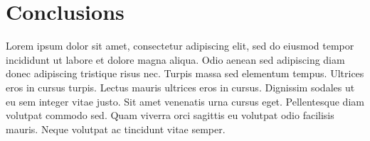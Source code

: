 \chapter{Conclusions}
\label{chapter:conclusions}

Lorem ipsum dolor sit amet, consectetur adipiscing elit, sed do eiusmod tempor incididunt ut labore et dolore magna aliqua. Odio aenean sed adipiscing diam donec adipiscing tristique risus nec. Turpis massa sed elementum tempus. Ultrices eros in cursus turpis. Lectus mauris ultrices eros in cursus. Dignissim sodales ut eu sem integer vitae justo. Sit amet venenatis urna cursus eget. Pellentesque diam volutpat commodo sed. Quam viverra orci sagittis eu volutpat odio facilisis mauris. Neque volutpat ac tincidunt vitae semper.